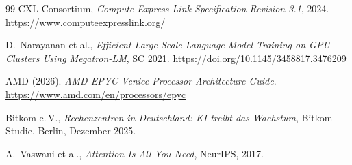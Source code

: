 ﻿\documentclass[a4paper,12pt]{article}
\theoremstyle{definition}
\begin{document}
\begin{thebibliography}{99}
  CXL Consortium,
  \emph{Compute Express Link Specification Revision 3.1}, 2024.
  \url{https://www.computeexpresslink.org/}

  D.~Narayanan et al.,
  \emph{Efficient Large-Scale Language Model Training on GPU Clusters Using Megatron-LM},
  SC 2021. \url{https://doi.org/10.1145/3458817.3476209}

  AMD (2026).
  \emph{AMD EPYC Venice Processor Architecture Guide}.
  \url{https://www.amd.com/en/processors/epyc}

  Bitkom e.\,V.,
  \emph{Rechenzentren in Deutschland: KI treibt das Wachstum},
  Bitkom-Studie, Berlin, Dezember 2025.

  A.~Vaswani et al.,
  \emph{Attention Is All You Need},
  NeurIPS, 2017.

\end{thebibliography}
\end{document}
